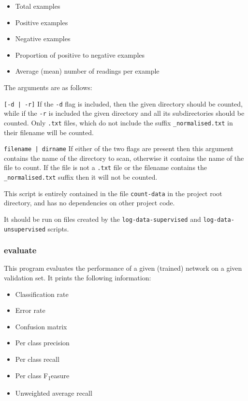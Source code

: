\documentclass[a4paper]{article}
\begin{document}
\begin{itemize}
\item Total examples
\item Positive examples
\item Negative examples
\item Proportion of positive to negative examples
\item Average (mean) number of readings per example
\end{itemize}

The arguments are as follows:

\lstinline{[-d | -r]} If the \lstinline{-d} flag is included, then the given directory should be counted, while if the \lstinline{-r} is included the given directory and all its subdirectories should be counted. Only \lstinline{.txt} files, which do not include the suffix \lstinline{_normalised.txt} in their filename will be counted.

\lstinline{filename | dirname} If either of the two flags are present then this argument contains the name of the directory to scan, otherwise it contains the name of the file to count. If the file is not a \lstinline{.txt} file or the filename contains the \lstinline{_normalised.txt} suffix then it will not be counted.

This script is entirely contained in the file \lstinline{count-data} in the project root directory, and has no dependencies on other project code.

It should be run on files created by the \lstinline{log-data-supervised} and \lstinline{log-data-unsupervised} scripts.

\subsubsection{evaluate}
\label{subsubsec:dc_csa_evaluate}

This program evaluates the performance of a given (trained) network on a given validation set. It prints the following information:

\begin{itemize}
\item Classification rate
\item Error rate
\item Confusion matrix
\item Per class precision
\item Per class recall
\item Per class F\texorpdfstring{\textsubscript{1}} measure
\item Unweighted average recall
\end{itemize}
\end{document}
